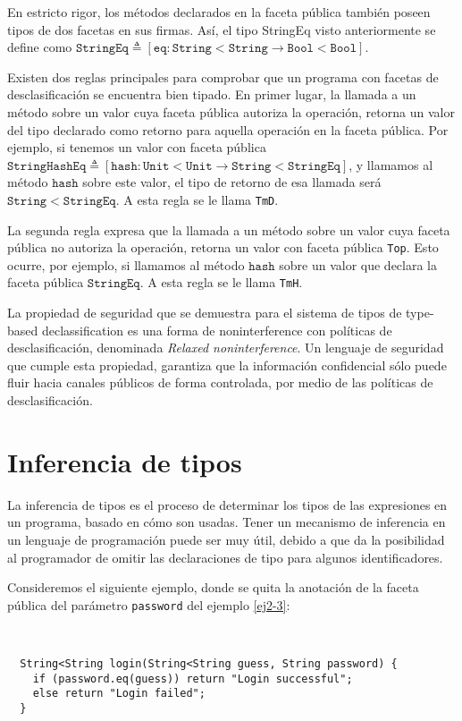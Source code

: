En estricto rigor, los métodos declarados en la faceta pública también poseen tipos de dos facetas en sus firmas. Así, el tipo StringEq visto anteriormente se define como $\mathtt{StringEq} \triangleq [\mathtt{eq} : \mathtt{String<String} \rightarrow \mathtt{Bool<Bool}]$.

Existen dos reglas principales para comprobar que un programa con facetas de desclasificación se encuentra bien tipado. En primer lugar, la llamada a un método sobre un valor cuya faceta pública autoriza la operación, retorna un valor del tipo declarado como retorno para aquella operación en la faceta pública. Por ejemplo, si tenemos un valor con faceta pública $\mathtt{StringHashEq} \triangleq [\mathtt{hash} : \mathtt{Unit<Unit} \rightarrow \mathtt{String<StringEq}]$, y llamamos al método $\mathtt{hash}$ sobre este valor, el tipo de retorno de esa llamada será $\mathtt{String<StringEq}$. A esta regla se le llama \texttt{TmD}.

La segunda regla expresa que la llamada a un método sobre un valor cuya faceta pública no autoriza la operación, retorna un valor con faceta pública \texttt{Top}. Esto ocurre, por ejemplo, si llamamos al método $\mathtt{hash}$ sobre un valor que declara la faceta pública $\mathtt{StringEq}$. A esta regla se le llama \texttt{TmH}.

La propiedad de seguridad que se demuestra para el sistema de tipos de type-based declassification es una forma de noninterference con políticas de desclasificación, denominada \emph{Relaxed noninterference}. Un lenguaje de seguridad que cumple esta propiedad, garantiza que la información confidencial sólo puede fluir hacia canales públicos de forma controlada, por medio de las políticas de desclasificación.

\section{Inferencia de tipos} \label{inference}
La inferencia de tipos es el proceso de determinar los tipos de las expresiones en un programa, basado en cómo son usadas. Tener un mecanismo de inferencia en un lenguaje de programación puede ser muy útil, debido a que da la posibilidad al programador de omitir las declaraciones de tipo para algunos identificadores.

Consideremos el siguiente ejemplo, donde se quita la anotación de la faceta pública del parámetro \texttt{password} del ejemplo \ref{ej2-3}:

\begin{ej} \ \\
  \normalfont
  \label{ej2-4}
\begin{lstlisting}
  String<String login(String<String guess, String password) {
  	if (password.eq(guess)) return "Login successful";
  	else return "Login failed";
  }
\end{lstlisting}
\end{ej}

